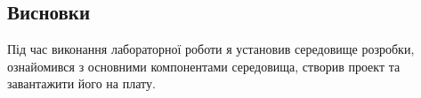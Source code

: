 \documentclass[oneside,14pt]{extarticle}
\begin{document}
\begin{normalsize}
	\section*{Висновки}
	Під час виконання лабораторної роботи я установив середовище розробки, ознайомився з основними
	компонентами середовища, створив проект та завантажити його на плату.
		    
\end{normalsize}
\end{document}
